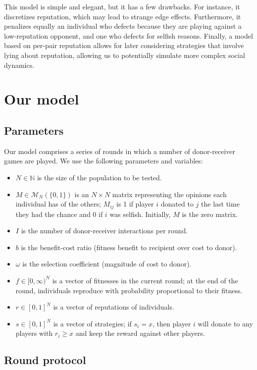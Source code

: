 \documentclass{amsart}
\begin{document}
This model is simple and elegant, but it has a few drawbacks. For instance, it discretizes reputation, which may lead to strange edge effects. Furthermore, it penalizes equally an individual who defects because they are playing against a low-reputation opponent, and one who defects for selfish reasons. Finally, a model based on per-pair reputation allows for later considering strategies that involve lying about reputation, allowing us to potentially simulate more complex social dynamics.

\section{Our model}

\subsection{Parameters}

Our model comprises a series of rounds in which a number of donor-receiver games are played. We use the following parameters and variables:

\begin{itemize}
\item $N \in \mathbb{N}$ is the size of the population to be tested.
\item $M \in \mathcal{M}_N(\{0,1\})$ is an $N \times N$ matrix representing the opinions each individual has of the others; $M_{ij}$ is 1 if player $i$ donated to $j$ the last time they had the chance and 0 if $i$ was selfish. Initially, $M$ is the zero matrix.
\item $I$ is the number of donor-receiver interactions per round.
\item $b$ is the benefit-cost ratio (fitness benefit to recipient over cost to donor).
\item $\omega$ is the selection coefficient (magnitude of cost to donor).
\item $f \in [0, \infty)^N$ is a vector of fitnesses in the current round; at the end of the round, individuals reproduce with probability proportional to their fitness.
\item $r \in [0,1]^N$ is a vector of reputations of individuals.
\item $s \in [0,1]^N$ is a vector of strategies; if $s_i = x$, then player $i$ will donate to any players with $r_i \ge x$ and keep the reward against other players.
\end{itemize}

\subsection{Round protocol}
\end{document}
